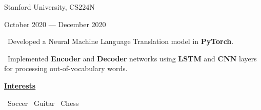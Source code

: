 \documentclass{article}
\begin{document}
\begin{minipage}[t][0pt]{8in\linewidth}
\begin{minipage}[t]{3.1in\linewidth\hspace{2.8em}}
\begin{minipage}[t]{3.3in\textwidth\hspace{0in}}
            \hspace{0.4em}\small\mdseries\textrm Stanford University, CS224N
            
            \hspace{0.4em}\small\mdseries\textrm October 2020 — December 2020
            
            \small\mdseries
            \vspace{0.4em}
            \hspace{1em}\textasteriskcentered \, \mdseries\textrm{Developed a Neural Machine Language Translation model in \textbf{PyTorch}.}
            
            \vspace{0.4em}
            \hspace{1em}\textasteriskcentered \, \mdseries\textrm{Implemented \textbf{Encoder} and \textbf{Decoder} networks using \textbf{LSTM} and \textbf{CNN} layers for processing out-of-vocabulary words.}
        \end{minipage}
    
    \begin{minipage}[t]{3.75in\textwidth\hspace{0in}}
        \vspace{1.5em}
        \large\mdseries\bfseries\underline{Interests}            
        
        \small\mdseries
        \vspace{0.3em}
        \hspace{0.3em}\textasteriskcentered \, \small\mdseries\textrm{Soccer}
        \hspace{0.3em}\textasteriskcentered \, \small\mdseries\textrm{Guitar}        
        \hspace{0.3em}\textasteriskcentered \, \small\mdseries\textrm{Chess}

    \end{minipage}

        
        

\end{minipage}
\end{minipage}
\end{document}
